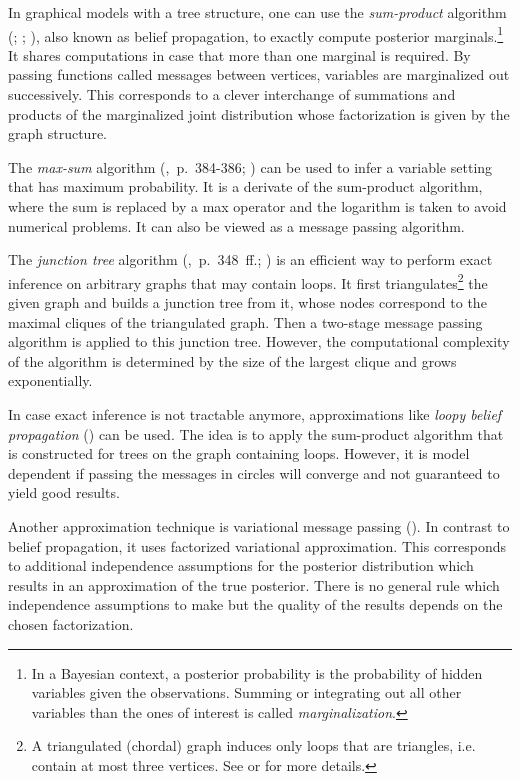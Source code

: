 In graphical models with a tree structure, one can use the \emph{sum-product} algorithm (\cite{pearl1988probabilistic}; \cite{kim1983computational}; \cite{pearl1982reverend}), also known as belief propagation, to exactly compute posterior marginals.\footnote{In a Bayesian context, a posterior probability is the probability of hidden variables given the observations. Summing or integrating out all other variables than the ones of interest is called \emph{marginalization}.} It shares computations in case that more than one marginal is required. By passing functions called messages between vertices, variables are marginalized out successively. This corresponds to a clever interchange of summations and products of the marginalized joint distribution whose factorization is given by the graph structure.

The \emph{max-sum} algorithm (\cite{bishop2006pattern},~p.~384-386; \cite{dawid1992applications}) can be used to infer a variable setting that has maximum probability. It is a derivate of the sum-product algorithm, where the sum is replaced by a max operator and the logarithm is taken to avoid numerical problems. It can also be viewed as a message passing algorithm.

The \emph{junction tree} algorithm (\cite{koller2009probabilistic},~p.~348~ff.; \cite{lauritzen1988local}) is an efficient way to perform exact inference on arbitrary graphs that may contain loops. It first triangulates\footnote{A triangulated (chordal) graph induces only loops that are triangles, i.e. contain at most three vertices.  See \textcite{fulkerson1965incidence} or \textcite{rose1976algorithmic} for more details.} the given graph and builds a junction tree from it, whose nodes correspond to the maximal cliques of the triangulated graph. Then a two-stage message passing algorithm is applied to this junction tree. However, the computational complexity of the algorithm is determined by the size of the largest clique and grows exponentially.

In case exact inference is not tractable anymore, approximations like \emph{loopy belief propagation} (\cite{frey1998revolution}) can be used. The idea is to apply the sum-product algorithm that is constructed for trees on the graph containing loops. However, it is model dependent if passing the messages in circles will converge and not guaranteed to yield good results.

Another approximation technique is variational message passing (\cite{winn2005variational}). In contrast to belief propagation, it uses factorized variational approximation. This corresponds to additional independence assumptions for the posterior distribution which results in an approximation of the true posterior. There is no general rule which independence assumptions to make but the quality of the results depends on the chosen factorization.

